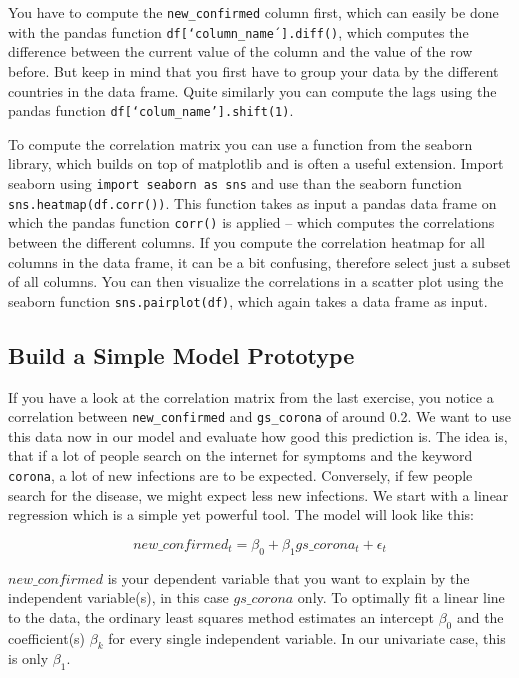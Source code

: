 \documentclass[
  11pt,
]{article}
\newenvironment{tips}[1]
  {
  \begin{itemize}
  \footnotesize
  \renewcommand{\labelitemi}{
    \raisebox{-.7\height}[0pt][0pt]{
      {\setkeys{Gin}{width=3em,keepaspectratio}
        \texttt{[image: images/\#1.png]}}
    }
  }
  \setlength{\fboxsep}{1em}
  \begin{rbox}
  \item
  }
  {
  \end{rbox}
  \end{itemize}
  }
\begin{document}
\begin{tips}p

You have to compute the \texttt{new\_confirmed} column first, which can easily be done with the pandas function \texttt{df{[}‘column\_name´{]}.diff()}, which computes the difference between the current value of the column and the value of the row before. But keep in mind that you first have to group your data by the different countries in the data frame.
Quite similarly you can compute the lags using the pandas function \texttt{df{[}‘colum\_name’{]}.shift(1)}.

To compute the correlation matrix you can use a function from the seaborn library, which builds on top of matplotlib and is often a useful extension.
Import seaborn using \texttt{import\ seaborn\ as\ sns} and use than the seaborn function \texttt{sns.heatmap(df.corr())}. This function takes as input a pandas data frame on which the pandas function \texttt{corr()} is applied -- which computes the correlations between the different columns. If you compute the correlation heatmap for all columns in the data frame, it can be a bit confusing, therefore select just a subset of all columns.
You can then visualize the correlations in a scatter plot using the seaborn function \texttt{sns.pairplot(df)}, which again takes a data frame as input.

\end{tips}

\hypertarget{build-a-simple-model-prototype}{%
\subsection{Build a Simple Model Prototype}\label{build-a-simple-model-prototype}}

If you have a look at the correlation matrix from the last exercise, you notice a correlation between \texttt{new\_confirmed} and \texttt{gs\_corona} of around 0.2. We want to use this data now in our model and evaluate how good this prediction is.
The idea is, that if a lot of people search on the internet for symptoms and the keyword \texttt{corona}, a lot of new infections are to be expected. Conversely, if few people search for the disease, we might expect less new infections. We start with a linear regression which is a simple yet powerful tool. The model will look like this:

\[ new\_confirmed_t = \beta_0 + \beta_1 gs\_corona_t +\epsilon_t \]

\(new\_confirmed\) is your dependent variable that you want to explain by the independent variable(s), in this case \(gs\_corona\) only. To optimally fit a linear line to the data, the ordinary least squares method estimates an intercept \(\beta_0\) and the coefficient(s) \(\beta_k\) for every single independent variable. In our univariate case, this is only \(\beta_1\).
\end{document}
